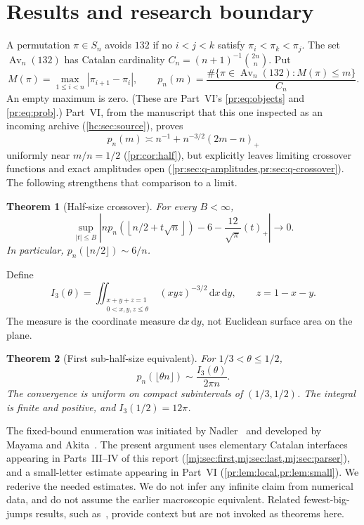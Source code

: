 \documentclass[11pt,a4paper]{article}
\newtheorem{theorem}{Theorem}[section]
\theoremstyle{definition}\newaliascnt{definition}{theorem}
\theoremstyle{remark}\newaliascnt{remark}{theorem}
\newcommand{\Av}{\operatorname{Av}}
\newcommand{\dd}{\mathrm d}
\newcommand{\prpos}[1]{(#1)_+}
\begin{document}
\section{Results and research boundary}
\label{hc:sec:results}
A permutation $\pi\in S_n$ avoids $132$ if no $i<j<k$ satisfy
$\pi_i<\pi_k<\pi_j$. The set $\Av_n(132)$ has Catalan cardinality
$C_n=(n+1)^{-1}\binom{2n}{n}$. Put
\[
 M(\pi)=\max_{1\le i<n}|\pi_{i+1}-\pi_i|,
 \qquad p_n(m)=\frac{\#\{\pi\in\Av_n(132):M(\pi)\le m\}}{C_n}.
\]
An empty maximum is zero. (These are Part~VI's \eqref{pr:eq:objects} and
\eqref{pr:eq:prob}.) Part~VI, from the manuscript that this one inspected
as an incoming archive (\cref{hc:sec:source}), proves
\[
 p_n(m)\asymp n^{-1}+n^{-3/2}\prpos{2m-n}
\]
uniformly near $m/n=1/2$ (\cref{pr:cor:half}), but explicitly leaves
limiting crossover functions and exact amplitudes open
(\cref{pr:sec:q-amplitudes,pr:sec:q-crossover}). The following strengthens
that comparison to a limit.

\begin{theorem}[Half-size crossover]\label{hc:thm:window}
For every $B<\infty$,
\[
 \sup_{|t|\le B}\left|
 n p_n\!\left(\left\lfloor n/2+t\sqrt n\right\rfloor\right)
 -6-\frac{12}{\sqrt\pi}\prpos t\right|\longrightarrow0.
\]
In particular, $p_n(\lfloor n/2\rfloor)\sim6/n$.
\end{theorem}

Define
\begin{equation}\label{hc:eq:I3}
 I_3(\theta)=\iint_{\substack{x+y+z=1\\0<x,y,z\le\theta}}
 (xyz)^{-3/2}\,\dd x\,\dd y,\qquad z=1-x-y.
\end{equation}
The measure is the coordinate measure $\dd x\,\dd y$, not Euclidean surface
area on the plane.
\begin{theorem}[First sub-half-size equivalent]\label{hc:thm:phase}
For $1/3<\theta\le1/2$,
\[
 p_n(\lfloor\theta n\rfloor)\sim\frac{I_3(\theta)}{2\pi n}.
\]
The convergence is uniform on compact subintervals of $(1/3,1/2)$. The
integral is finite and positive, and $I_3(1/2)=12\pi$.
\end{theorem}

The fixed-bound enumeration was initiated by Nadler~\cite{Nadler} and
developed by Mayama and Akita~\cite{MayamaAkita}. The present argument uses
elementary Catalan interfaces appearing in Parts~III--IV of this report
(\cref{mj:sec:first,mj:sec:last,mj:sec:parser}), and a small-letter
estimate appearing in Part~VI (\cref{pr:lem:local,pr:lem:small}). We
rederive the needed estimates. We do not infer any infinite claim from
numerical data, and do not assume the earlier macroscopic equivalent. Related
fewest-big-jumps results, such as~\cite{pr:KerriouMorters}, provide context
but are not invoked as theorems here.
\end{document}
